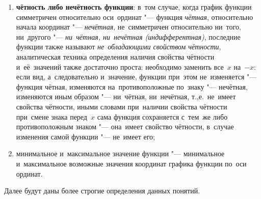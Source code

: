 \documentclass[]{scrartcl}
\begin{document}
\begin{enumerate}
	\item \textbf{чётность либо нечётность функции}: в~том случае, когда график функции симметричен относительно оси~ординат "--- функция \emph{чётная}, относительно начала координат "--- \emph{нечётная}, не~симметричен относительно ни~того, ни~другого "--- \emph{ни~чётная, ни~нечётная (индифферентная)}, последние функции также называют \emph{не~обладающими свойством чётности}, аналитическая техника определения наличия свойства чётности и~её~значений также достаточно проста: необходимо заменить все~${\textstyle x}$ на~${\textstyle -x}$: если вид, а~следовательно и~значение, функции при~этом не~изменяется "--- функция чётная, изменяются на~противоположные по~знаку "--- нечётная, изменяются иным образом "--- ни~чётная, ни~нечётная, т.,е.~не~имеет свойства чётности, иными словами при~наличии свойства чётности при~смене знака перед~${\textstyle x}$ сама функция сохраняется с~тем~же либо противоположным знаком "--- она~имеет свойство чётности, в~случае изменения самой функции "--- не~имеет его;
	\item минимальное и~максимальное значение функции "--- минимальное и~максимальное возможные значения координат графика функции по~оси ординат.  
\end{enumerate}
Далее будут даны более строгие определения данных понятий.
\end{document}

